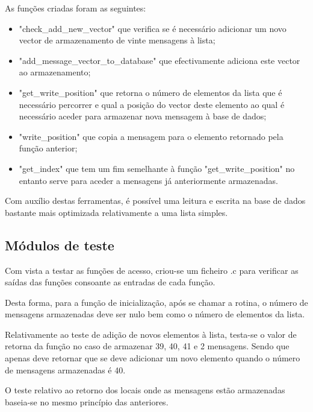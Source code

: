 \documentclass[a4paper]{article}
\begin{document}
As funções criadas foram as seguintes:

\begin{itemize}

\item "check\_add\_new\_vector" que verifica se é necessário adicionar um novo vector de armazenamento de vinte mensagens à lista;

\item "add\_message\_vector\_to\_database" que efectivamente adiciona este vector ao armazenamento;

\item "get\_write\_position" que retorna o número de elementos da lista que é necessário percorrer e qual a posição do vector deste elemento ao qual é necessário aceder para armazenar nova mensagem à base de dados;

\item "write\_position" que copia a mensagem para o elemento retornado pela função anterior;

\item "get\_index" que tem um fim semelhante à função "get\_write\_position" no entanto serve para aceder a mensagens já anteriormente armazenadas.

\end{itemize}

Com auxílio destas ferramentas, é possível uma leitura e escrita na base de dados bastante mais optimizada relativamente a uma lista simples.

\subsection{Módulos de teste}

Com vista a testar as funções de acesso, criou-se um ficheiro .c para verificar as saídas das funções consoante as entradas de cada função. 

Desta forma, para a função de inicialização, após se chamar a rotina, o número de mensagens armazenadas deve ser nulo bem como o número de elementos da lista.

Relativamente ao teste de adição de novos elementos à lista, testa-se o valor de retorna da função no caso de armazenar 39, 40, 41 e 2 mensagens. Sendo que apenas deve retornar que se deve adicionar um novo elemento quando o número de mensagens armazenadas é 40.

O teste relativo ao retorno dos locais onde as mensagens estão armazenadas baseia-se no mesmo princípio das anteriores.
\end{document}
